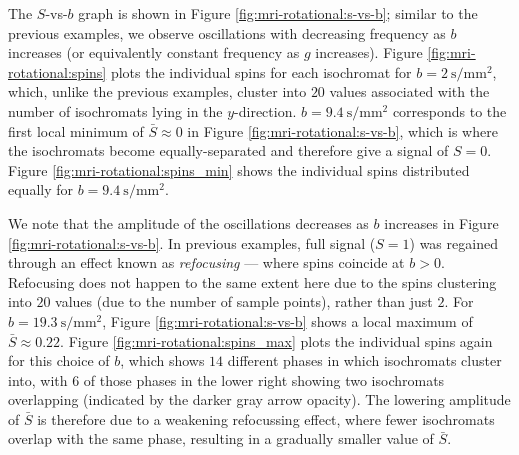             The $S$-vs-$b$ graph is shown in Figure \ref{fig:mri-rotational:s-vs-b}; similar to the previous examples, we observe oscillations with decreasing frequency as $b$ increases (or equivalently constant frequency as $g$ increases). Figure \ref{fig:mri-rotational:spins} plots the individual spins for each isochromat for $b=\qty{2}{\second\per\milli\metre^2}$, which, unlike the previous examples, cluster into $20$ values associated with the number of isochromats lying in the $y$-direction. $b=\qty{9.4}{\second\per\milli\metre^2}$ corresponds to the first local minimum of $\bar{S} \approx 0$ in Figure \ref{fig:mri-rotational:s-vs-b}, which is where the isochromats become equally-separated and therefore give a signal of $S=0$. Figure \ref{fig:mri-rotational:spins_min} shows the individual spins distributed equally for $b=\qty{9.4}{\second\per\milli\metre^2}$.
            
            We note that the amplitude of the oscillations decreases as $b$ increases in Figure \ref{fig:mri-rotational:s-vs-b}. In previous examples, full signal ($S=1$) was regained through an effect known as \textit{refocusing} --- where spins coincide at $b>0$. Refocusing does not happen to the same extent here due to the spins clustering into $20$ values (due to the number of sample points), rather than just $2$. For $b = \qty{19.3}{\second\per\milli\metre^2}$, Figure \ref{fig:mri-rotational:s-vs-b} shows a local maximum of $\bar{S} \approx 0.22$. Figure \ref{fig:mri-rotational:spins_max} plots the individual spins again for this choice of $b$, which shows $14$ different phases in which isochromats cluster into, with $6$ of those phases in the lower right showing two isochromats overlapping (indicated by the darker gray arrow opacity). The lowering amplitude of $\bar{S}$ is therefore due to a weakening refocussing effect, where fewer isochromats overlap with the same phase, resulting in a gradually smaller value of $\bar{S}$.

